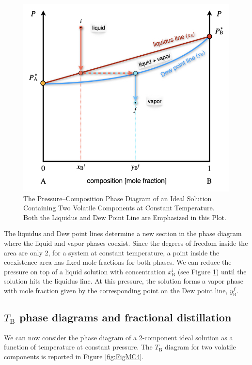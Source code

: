 \documentclass[
  9pt,
]{extbook}
\theoremstyle{definition}
\theoremstyle{definition}
\theoremstyle{definition}
\theoremstyle{remark}
\begin{document}
\begin{figure}

{\centering \includegraphics[width=0.6\linewidth]{./img/OEP_Figures.021} 

}

\caption{The Pressure–Composition Phase Diagram of an Ideal Solution Containing Two Volatile Components at Constant Temperature. Both the Liquidus and Dew Point Line are Emphasized in this Plot.}\label{fig:FigMC3}
\end{figure}

The liquidus and Dew point lines determine a new section in the phase diagram where the liquid and vapor phases coexist. Since the degrees of freedom inside the area are only 2, for a system at constant temperature, a point inside the coexistence area has fixed mole fractions for both phases. We can reduce the pressure on top of a liquid solution with concentration \(x^i_{\text{B}}\) (see Figure \ref{fig:FigMC3}) until the solution hits the liquidus line. At this pressure, the solution forms a vapor phase with mole fraction given by the corresponding point on the Dew point line, \(y^f_{\text{B}}\).

\hypertarget{t_textb-phase-diagrams-and-fractional-distillation}{%
\subsection{\texorpdfstring{\(T_{\text{B}}\) phase diagrams and fractional distillation}{T\_\{\textbackslash text\{B\}\} phase diagrams and fractional distillation}}\label{t_textb-phase-diagrams-and-fractional-distillation}}

We can now consider the phase diagram of a 2-component ideal solution as a function of temperature at constant pressure. The \(T_{\text{B}}\) diagram for two volatile components is reported in Figure \ref{fig:FigMC4}.
\end{document}
